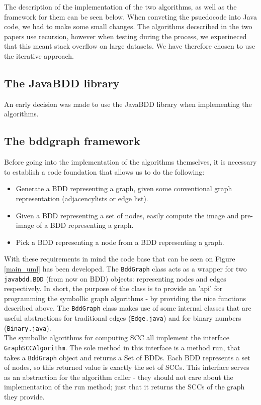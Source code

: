 \documentclass[../master/master.tex]{subfiles}
\begin{document}
The description of the implementation of the two algorithms, as well as the framework for them can be seen below. When conveting the psuedocode into Java code, we had to make some small changes. The algorithms decscribed in the two papers \cite{lockstep}\cite{linear} use recursion, however when testing during the process, we experineced that this meant stack overflow on large datasets. We have therefore chosen to use the iterative approach.

\subsection{The JavaBDD library}
An early decision was made to use the JavaBDD library when implementing the algorithms. \cite{whaley}

\subsection{The bddgraph framework}
Before going into the implementation of the algorithms themselves, it is necessary to establish a code foundation that allows us to do the following:
\begin{itemize}
\item Generate a BDD representing a graph, given some conventional graph representation (adjacencylists or edge list).
\item Given a BDD representing a set of nodes, easily compute the image and pre-image of a BDD representing a graph.
\item Pick a BDD representing a node from a BDD representing a graph.
\end{itemize}

With these requirements in mind the code base that can be seen on Figure \ref{main_uml} has been developed. The \texttt{BddGraph} class acts as a wrapper for two \texttt{javabdd.BDD} (from now on BDD) objects: representing nodes and edges respectively. In short, the purpose of the class is to provide an 'api' for programming the symbollic graph algorithms - by providing the nice functions described above. The \texttt{BddGraph} class makes use of some internal classes that are useful abstractions for traditional edges (\texttt{Edge.java}) and for binary numbers (\texttt{Binary.java}).\\

The symbollic algorithms for computing SCC all implement the interface \texttt{GraphSCCAlgorithm}. The sole method in this interface is a method run, that takes a \texttt{BddGraph} object and returns a Set of BDDs. Each BDD represents a set of nodes, so this returned value is exactly the set of SCCs. This interface serves as an abstraction for the algorithm caller - they should not care about the implementation of the run method; just that it returns the SCCs of the graph they provide. 
\end{document}
